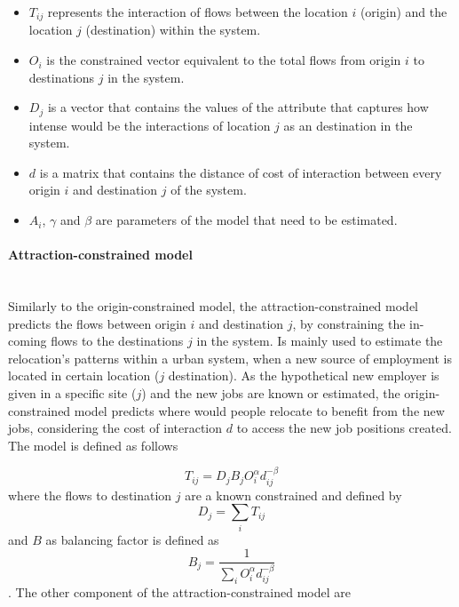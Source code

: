 \documentclass{article}
\begin{document}
\begin{itemize}
  \item $T_{ij}$ represents the interaction of flows between the location $i$ (origin) and the location $j$ (destination) within the system. 
  \item $O_{i}$ is the constrained vector equivalent to the total flows from origin $i$ to destinations $j$ in the system.
  \item $D_{j}$ is a vector that contains the values of the attribute that captures how intense would be the interactions of location $j$ as an destination in the system.
    \item $d$ is a matrix that contains the distance of cost of interaction between every origin $i$ and destination $j$ of the system.
    \item $A_{i}$, $\gamma$ and $\beta$ are parameters of the model that need to be estimated.
\end{itemize}

\paragraph{Attraction-constrained model}\mbox{}\\

Similarly to the origin-constrained model, the attraction-constrained model predicts the flows between origin $i$ and destination $j$, by constraining the in-coming flows to the destinations $j$ in the system. Is mainly used to estimate the relocation's patterns within a urban system, when a new source of employment is located in certain location ($j$ destination). As the hypothetical new employer is given in a specific site ($j$) and the new jobs are known or estimated, the origin-constrained model predicts where would people relocate to benefit from the new jobs, considering the  cost of interaction $d$ to access the new job positions created. The model is defined as follows

\[T_{ij} = D_j B_j O_i^\alpha d_{ij}^{-\beta}\] where the flows to destination $j$ are a known constrained and defined by \[D_j = \sum_i T_{ij}\] and $B$ as balancing factor is defined as \[B_j = \frac{1}{\sum_i O_i^\alpha d_{ij}^{-\beta}}\]. The other component of the attraction-constrained model are
\end{document}
